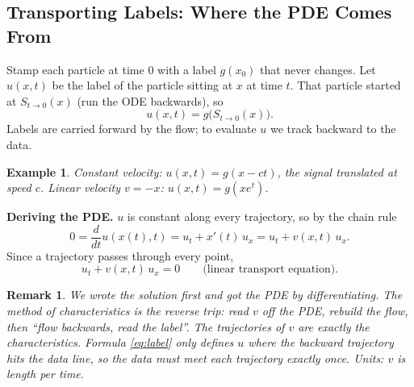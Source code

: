 \documentclass{article}
\newtheorem*{example}{Example}
\newtheorem{remark}{Remark}
\begin{document}
\subsection{Transporting Labels: Where the PDE Comes From}
Stamp each particle at time $0$ with a label $g(x_0)$ that never changes. Let $u(x,t)$ be the label of the particle sitting at $x$ at time $t$. That particle started at $S_{t\to 0}(x)$ (run the ODE backwards), so
\begin{equation}\label{eq:label}
    u(x,t) = g\big(S_{t \to 0}(x)\big).
\end{equation}
Labels are carried forward by the flow; to evaluate $u$ we track backward to the data.
\begin{example}
    Constant velocity: $u(x,t) = g(x - ct)$, the signal translated at speed $c$. Linear velocity $v = -x$: $u(x,t) = g(x e^{t})$.
\end{example}
\textbf{Deriving the PDE.} $u$ is constant along every trajectory, so by the chain rule
\begin{equation}
    0 = \frac{d}{dt} u(x(t), t) = u_t + x'(t)\, u_x = u_t + v(x,t)\, u_x .
\end{equation}
Since a trajectory passes through every point,
\begin{equation}
    u_t + v(x,t)\, u_x = 0 \qquad \text{(linear transport equation)}.
\end{equation}
\begin{remark}
    We wrote the solution first and got the PDE by differentiating. The method of characteristics is the reverse trip: read $v$ off the PDE, rebuild the flow, then ``flow backwards, read the label''. The trajectories of $v$ are exactly the characteristics. Formula \eqref{eq:label} only defines $u$ where the backward trajectory hits the data line, so the data must meet each trajectory exactly once. Units: $v$ is length per time.
\end{remark}
\end{document}
